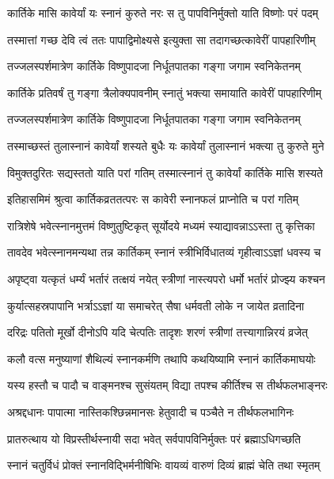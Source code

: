 \twolineshloka
{कार्तिके मासि कावेर्यां यः स्नानं कुरुते नरः}
{स तु पापविनिर्मुक्तो याति विष्णोः परं पदम्} %

\twolineshloka
{तस्मात्तां गच्छ देवि त्वं ततः पापाद्विमोक्ष्यसे}
{इत्युक्ता सा तदागच्छत्कावेरीं पापहारिणीम्} %

\twolineshloka
{तज्जलस्पर्शमात्रेण कार्तिके विष्णुपादजा}
{निर्धूतपातका गङ्गा जगाम स्वनिकेतनम्} %

\twolineshloka
{कार्तिके प्रतिवर्षं तु गङ्गा त्रैलोक्यपावनीम्}
{स्नातुं भक्त्या समायाति कावेरीं पापहारिणीम्} %

\twolineshloka
{तज्जलस्पर्शमात्रेण कार्तिके विष्णुपादजा}
{निर्धूतपातका गङ्गा जगाम स्वनिकेतनम्} %

\twolineshloka
{तस्माच्छस्तं तुलास्नानं कावेर्यां शस्यते बुधैः}
{यः कावेर्यां तुलास्नानं भक्त्या तु कुरुते मुने} %

\twolineshloka
{विमुक्तदुरितः सद्यस्ततो याति परां गतिम्}
{तस्मात्स्नानं तु कावेर्यां कार्तिके मासि शस्यते} %

\twolineshloka
{इतिहासमिमं श्रुत्वा कार्तिकव्रततत्परः}
{स कावेरी स्नानफलं प्राप्नोति च परां गतिम्} %

\twolineshloka
{रात्रिशेषे भवेत्स्नानमुत्तमं विष्णुतुष्टिकृत्}
{सूर्योदये मध्यमं स्याद्यावन्नाऽऽस्ता तु कृत्तिका} %

\twolineshloka
{तावदेव भवेत्स्नानमन्यथा तन्न कार्तिकम्}
{स्नानं स्त्रीभिर्विधातव्यं गृहीत्वाऽऽज्ञां धवस्य च} %

\twolineshloka
{अपृष्ट्वा यत्कृतं धर्म्यं भर्तारं तत्क्षयं नयेत्}
{स्त्रीणां नास्त्यपरो धर्मो भर्तारं प्रोज्झ्य कश्चन} %

\twolineshloka
{कुर्यात्सहस्रपापानि भर्त्राऽऽज्ञां या समाचरेत्}
{सैषा धर्मवती लोके न जायेत व्रतादिना} %

\twolineshloka
{दरिद्रः पतितो मूर्खो दीनोऽपि यदि चेत्पतिः}
{तादृशः शरणं स्त्रीणां तत्त्यागान्निरयं व्रजेत्} %

\twolineshloka
{कलौ वत्स मनुष्याणां शैथिल्यं स्नानकर्मणि}
{तथापि कथयिष्यामि स्नानं कार्तिकमाघयोः} %

\twolineshloka
{यस्य हस्तौ च पादौ च वाङ्मनश्च सुसंयतम्}
{विद्या तपश्च कीर्तिश्च स तीर्थफलभाङ्नरः} %

\twolineshloka
{अश्रद्दधानः पापात्मा नास्तिकश्छिन्नमानसः}
{हेतुवादी च पञ्चैते न तीर्थफलभागिनः} %

\twolineshloka
{प्रातरुत्थाय यो विप्रस्तीर्थस्नायी सदा भवेत्}
{सर्वपापविनिर्मुक्तः परं ब्रह्माऽधिगच्छति} %

\twolineshloka
{स्नानं चतुर्विधं प्रोक्तं स्नानविद्भिर्मनीषिभिः}
{वायव्यं वारुणं दिव्यं ब्राह्मं चेति तथा स्मृतम्} %


